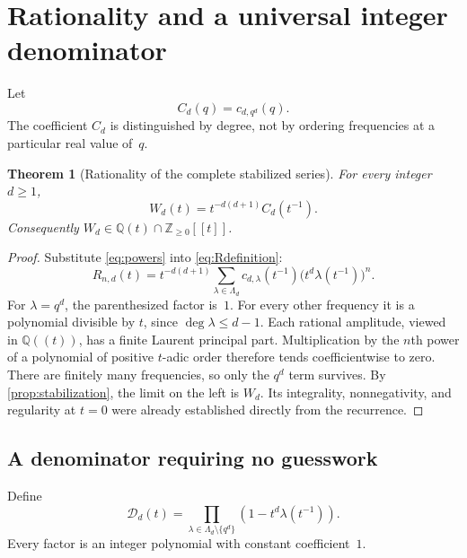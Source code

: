 \documentclass[11pt,letterpaper]{article}
\numberwithin{equation}{section}
\newtheorem{theorem}{Theorem}[section]
\theoremstyle{definition}
\theoremstyle{remark}
\newcommand{\Q}{\mathbb Q}
\newcommand{\Z}{\mathbb Z}
\newcommand{\Spec}{\Lambda}
\begin{document}
\section{Rationality and a universal integer denominator}\label{sec:rationality}
Let
\begin{equation}\label{eq:C}
 C_d(q)=c_{d,q^d}(q).
\end{equation}
The coefficient $C_d$ is distinguished by degree, not by ordering
frequencies at a particular real value of~$q$.

\begin{theorem}[Rationality of the complete stabilized series]\label{thm:rationality}
For every integer $d\ge1$,
\begin{equation}\label{eq:mainW}
 \boxed{\displaystyle W_d(t)=t^{-d(d+1)}C_d(t^{-1}).}
\end{equation}
Consequently $W_d\in\Q(t)\cap\Z_{\ge0}[[t]]$.
\end{theorem}
\begin{proof}
Substitute \eqref{eq:powers} into \eqref{eq:Rdefinition}:
\begin{equation}\label{eq:limit}
 R_{n,d}(t)=t^{-d(d+1)}
 \sum_{\lambda\in\Spec_d}c_{d,\lambda}(t^{-1})
                  \bigl(t^d\lambda(t^{-1})\bigr)^n.
\end{equation}
For $\lambda=q^d$, the parenthesized factor is~$1$.
For every other frequency it is a polynomial divisible by $t$,
since $\deg\lambda\le d-1$.
Each rational amplitude, viewed in $\Q((t))$, has a finite Laurent
principal part. Multiplication by the $n$th power of a polynomial of
positive $t$-adic order therefore tends coefficientwise to zero.
There are finitely many frequencies, so only the $q^d$ term survives.
By \cref{prop:stabilization}, the limit on the left is $W_d$.
Its integrality, nonnegativity, and regularity at $t=0$ were already
established directly from the recurrence.
\end{proof}

\subsection{A denominator requiring no guesswork}
Define
\begin{equation}\label{eq:univden}
 \mathcal D_d(t)=
 \prod_{\lambda\in\Spec_d\setminus\{q^d\}}
       \left(1-t^d\lambda(t^{-1})\right).
\end{equation}
Every factor is an integer polynomial with constant coefficient~$1$.
\end{document}
